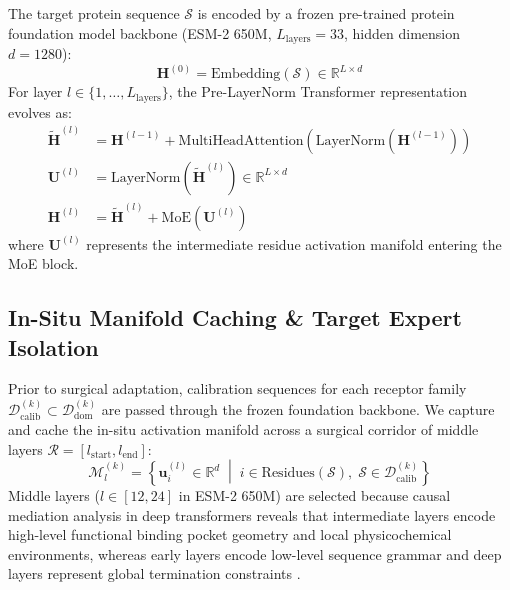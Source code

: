 \documentclass{article}
\theoremstyle{definition}
\begin{document}
The target protein sequence $\mathcal{S}$ is encoded by a frozen pre-trained protein foundation model backbone (ESM-2 650M, $L_{\text{layers}} = 33$, hidden dimension $d = 1280$):
\begin{equation}
\mathbf{H}^{(0)} = \text{Embedding}(\mathcal{S}) \in \mathbb{R}^{L \times d}
\end{equation}
For layer $l \in \{1, \dots, L_{\text{layers}}\}$, the Pre-LayerNorm Transformer representation evolves as:
\begin{align}
\tilde{\mathbf{H}}^{(l)} &= \mathbf{H}^{(l-1)} + \text{MultiHeadAttention}(\text{LayerNorm}(\mathbf{H}^{(l-1)})) \\
\mathbf{U}^{(l)} &= \text{LayerNorm}(\tilde{\mathbf{H}}^{(l)}) \in \mathbb{R}^{L \times d} \\
\mathbf{H}^{(l)} &= \tilde{\mathbf{H}}^{(l)} + \text{MoE}(\mathbf{U}^{(l)})
\end{align}
where $\mathbf{U}^{(l)}$ represents the intermediate residue activation manifold entering the MoE block.

\subsection{In-Situ Manifold Caching \& Target Expert Isolation}
Prior to surgical adaptation, calibration sequences for each receptor family $\mathcal{D}_{\text{calib}}^{(k)} \subset \mathcal{D}_{\text{dom}}^{(k)}$ are passed through the frozen foundation backbone. We capture and cache the in-situ activation manifold across a surgical corridor of middle layers $\mathcal{R} = [l_{\text{start}}, l_{\text{end}}]$:
\begin{equation}
\mathcal{M}_l^{(k)} = \left\{ \mathbf{u}_i^{(l)} \in \mathbb{R}^d \;\middle|\; i \in \text{Residues}(\mathcal{S}), \;\mathcal{S} \in \mathcal{D}_{\text{calib}}^{(k)} \right\}
\end{equation}
Middle layers ($l \in [12, 24]$ in ESM-2 650M) are selected because causal mediation analysis in deep transformers reveals that intermediate layers encode high-level functional binding pocket geometry and local physicochemical environments, whereas early layers encode low-level sequence grammar and deep layers represent global termination constraints \citep{meng2022locating,rahim2026segr}.
\end{document}
